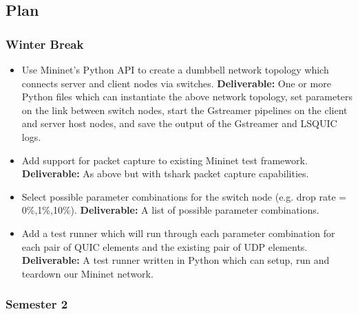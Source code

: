 \documentclass[11pt]{article}
\begin{document}
\subsection{Plan}\label{plan}

\subsubsection{Winter Break}

\begin{itemize}
  \item Use Mininet's Python API to create a dumbbell network topology which connects server and client nodes via switches. \textbf{Deliverable:}
  One or more Python files which can instantiate the above network topology, set parameters on the link between switch nodes, start the Gstreamer pipelines on the client and server host nodes, and save the output of the Gstreamer and LSQUIC logs.
  \item Add support for packet capture to existing Mininet test framework. \textbf{Deliverable:}
  As above but with tshark packet capture capabilities.
  \item Select possible parameter combinations for the switch node (e.g. drop rate = 0\%,1\%,10\%). \textbf{Deliverable:} A list of possible parameter combinations.
  \item Add a test runner which will run through each parameter combination for each pair of QUIC elements and the existing pair of UDP elements. \textbf{Deliverable:} A test runner written in Python which can setup, run and teardown our Mininet network.
\end{itemize}

\subsubsection{Semester 2}
\end{document}
